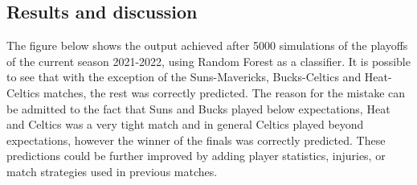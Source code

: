 \documentclass{article}
\begin{document}
\subsection{Results and discussion}
\label{ResultsAndDiscussion}
The figure below shows the output achieved after 5000 simulations of the playoffs of the current season 2021-2022, using Random Forest as a classifier. It is possible to see that with the exception of the Suns-Mavericks, Bucks-Celtics and Heat-Celtics matches, the rest was correctly predicted. The reason for the mistake can be admitted to the fact that Suns and Bucks played below expectations, Heat and Celtics was a very tight match and in general Celtics played beyond expectations, however the winner of the finals was correctly predicted. These predictions could be further improved by adding player statistics, injuries, or match strategies used in previous matches.  
\begin{figure}[h!]
\centering
{} \quad
\label{fig:playoffs}
\end{figure} 



\end{document}
